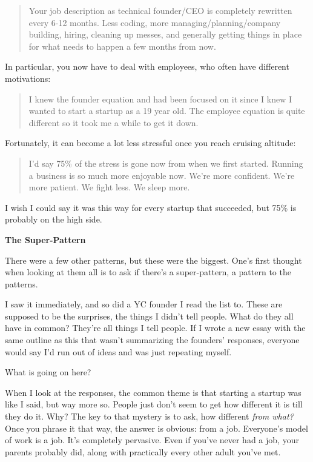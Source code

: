 \begin{quote}
Your job description as technical founder/CEO is completely rewritten
every 6-12 months. Less coding, more managing/planning/company building,
hiring, cleaning up messes, and generally getting things in place for
what needs to happen a few months from now.
\end{quote}

In particular, you now have to deal with employees, who often have
different motivations:

\begin{quote}
I knew the founder equation and had been focused on it since I knew I
wanted to start a startup as a 19 year old. The employee equation is
quite different so it took me a while to get it down.
\end{quote}

Fortunately, it can become a lot less stressful once you reach cruising
altitude:

\begin{quote}
I'd say 75\% of the stress is gone now from when we first started.
Running a business is so much more enjoyable now. We're more confident.
We're more patient. We fight less. We sleep more.
\end{quote}

I wish I could say it was this way for every startup that succeeded, but
75\% is probably on the high side.

\textbf{The Super-Pattern}

There were a few other patterns, but these were the biggest. One's first
thought when looking at them all is to ask if there's a super-pattern, a
pattern to the patterns.

I saw it immediately, and so did a YC founder I read the list to. These
are supposed to be the surprises, the things I didn't tell people. What
do they all have in common? They're all things I tell people. If I wrote
a new essay with the same outline as this that wasn't summarizing the
founders' responses, everyone would say I'd run out of ideas and was
just repeating myself.

What is going on here?

When I look at the responses, the common theme is that starting a
startup was like I said, but way more so. People just don't seem to get
how different it is till they do it. Why? The key to that mystery is to
ask, how different \emph{from what?} Once you phrase it that way, the
answer is obvious: from a job. Everyone's model of work is a job. It's
completely pervasive. Even if you've never had a job, your parents
probably did, along with practically every other adult you've met.

